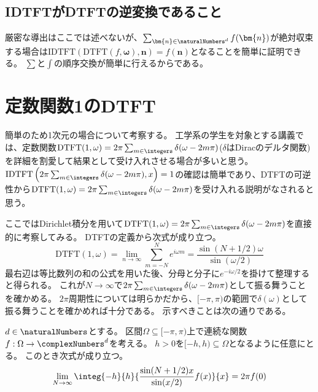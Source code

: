 				\subsection{IDTFTがDTFTの逆変換であること}
					厳密な導出はここでは述べないが、$\sum_{\bm{n}\in\naturalNumbers^d} f(\bm{n})$が絶対収束する場合は$\text{IDTFT}(\text{DTFT}(f,\bm{\omega}),\bm{n}) = f(\bm{n})$となることを簡単に証明できる。
					$\sum$と$\int$の順序交換が簡単に行えるからである。
			\section{定数関数1のDTFT}
				簡単のため1次元の場合について考察する。
				工学系の学生を対象とする講義では、定数関数$\text{DTFT}(1,\omega) = 2\pi\sum_{m\in\integers}\delta(\omega-2m\pi)$($\delta$はDiracのデルタ関数)を詳細を割愛して結果として受け入れさせる場合が多いと思う。
				$\text{IDTFT}\left(2\pi\sum_{m\in\integers}\delta(\omega-2m\pi),x\right)=1$の確認は簡単であり、DTFTの可逆性から$\text{DTFT}(1,\omega) = 2\pi\sum_{m\in\integers}\delta(\omega-2m\pi)$を受け入れる説明がなされると思う。
				\par
				ここではDirichlet積分を用いて$\text{DTFT}(1,\omega) = 2\pi\sum_{m\in\integers}\delta(\omega-2m\pi)$を直接的に考察してみる。
				DTFTの定義から次式が成り立つ。
				\[
					\text{DTFT}(1,\omega) = \lim_{n\to\infty} \sum_{m=-N}^N e^{i\omega m} = \frac{\sin(N+1/2)\omega}{\sin(\omega/2)}
				\]
				最右辺は等比数列の和の公式を用いた後、分母と分子に$e^{-i\omega/2}$を掛けて整理すると得られる。
				これが$N\to\infty$で$2\pi\sum_{m\in\integers}\delta(\omega-2m\pi)$として振る舞うことを確かめる。
				$2\pi$周期性については明らかだから、$[-\pi,\pi)$の範囲で$\delta(\omega)$として振る舞うことを確かめれば十分である。
				示すべきことは次の通りである。
				\begin{shadebox}
					$d\in\naturalNumbers$とする。
					区間$\Omega \subseteq [-\pi,\pi)$上で連続な関数$f:\Omega\to\complexNumbers^d$を考える。
					$h>0$を$[-h,h) \subseteq \Omega$となるように任意にとる。
					このとき次式が成り立つ。
					\[
						\lim_{N\to\infty} \integ{-h}{h}{\frac{\sin(N+1/2)x}{\sin(x/2)} f(x)}{x} = 2\pi f(0)
					\]
				\end{shadebox}
